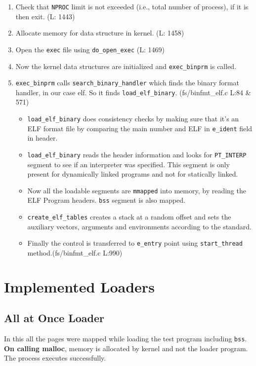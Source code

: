 \documentclass[10pt] {article}
\begin{document}
\begin{enumerate}
\item Check that \texttt{NPROC} limit is not exceeded (i.e., total number of process), if it is then exit. (L: 1443)
\item Allocate memory for data structure in kernel. (L: 1458) 
\item Open the \texttt{exec} file using \texttt{do\_open\_exec} (L: 1469)
\item Now the kernel data structures are initialized and \texttt{exec\_binprm} is called. 
\item \texttt{exec\_binprm} calls \texttt{search\_binary\_handler} which finds the binary format handler, in our case elf. So it finds \texttt{load\_elf\_binary}. (fs/binfmt\_elf.c L:84 \& 571)
\begin{itemize}
\item \texttt{load\_elf\_binary} does consistency checks by making sure that it's an ELF format file by comparing the main number and ELF in \texttt{e\_ident} field in header.
\item \texttt{load\_elf\_binary} reads the header information and looks for \texttt{PT\_INTERP} segment to see if an interpreter was specified. This segment is only present for dynamically linked programs and not for statically linked.
\item Now all the loadable segments are \texttt{mmapped} into memory, by reading the ELF Program headers. \texttt{bss} segment is also mapped.
\item \texttt{create\_elf\_tables} creates a stack at a random offset and sets the auxiliary vectors, arguments and environments according to the standard.
\item Finally the control is transferred to \texttt{e\_entry} point using \texttt{start\_thread} method.(fs/binfmt\_elf.c L:990)
\end{itemize}
\end{enumerate}

\section{Implemented Loaders}
\subsection{All at Once Loader}
In this all the pages were mapped while loading the test program including \texttt{bss}. 
\textbf{On calling malloc}, memory is allocated by kernel and not the loader program. The process executes successfully.
\end{document}
